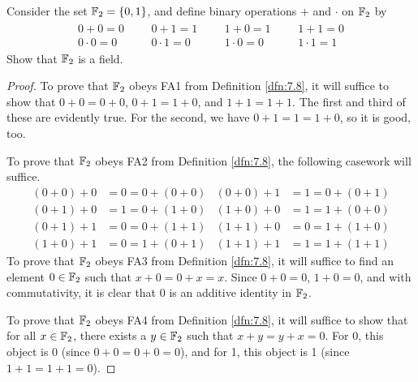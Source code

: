 \documentclass[../main.tex]{subfiles}
\begin{document}
\begin{exercise}\label{exr:7.9}
    Consider the set $\mathbb{F}_2=\{0,1\}$, and define binary operations $+$ and $\cdot$ on $\mathbb{F}_2$ by
    \begin{align*}
        \begin{split}
            0+0 = 0\\
            0\cdot 0 = 0
        \end{split}&&
        \begin{split}
            0+1 = 1\\
            0\cdot 1 = 0
        \end{split}&&
        \begin{split}
            1+0 = 1\\
            1\cdot 0 = 0
        \end{split}&&
        \begin{split}
            1+1 = 0\\
            1\cdot 1 = 1
        \end{split}
    \end{align*}
    Show that $\mathbb{F}_2$ is a field.
    \begin{proof}
        To prove that $\mathbb{F}_2$ obeys FA1 from Definition \ref{dfn:7.8}, it will suffice to show that $0+0=0+0$, $0+1=1+0$, and $1+1=1+1$. The first and third of these are evidently true. For the second, we have $0+1=1=1+0$, so it is good, too.\par
        To prove that $\mathbb{F}_2$ obeys FA2 from Definition \ref{dfn:7.8}, the following casework will suffice.
        \begin{align*}
            (0+0)+0 &= 0 = 0+(0+0)&
            (0+0)+1 &= 1 = 0+(0+1)\\
            (0+1)+0 &= 1 = 0+(1+0)&
            (1+0)+0 &= 1 = 1+(0+0)\\
            (0+1)+1 &= 0 = 0+(1+1)&
            (1+1)+0 &= 0 = 1+(1+0)\\
            (1+0)+1 &= 0 = 1+(0+1)&
            (1+1)+1 &= 1 = 1+(1+1)
        \end{align*}
        To prove that $\mathbb{F}_2$ obeys FA3 from Definition \ref{dfn:7.8}, it will suffice to find an element $0\in\mathbb{F}_2$ such that $x+0=0+x=x$. Since $0+0=0$, $1+0=0$, and with commutativity, it is clear that 0 is an additive identity in $\mathbb{F}_2$.\par
        To prove that $\mathbb{F}_2$ obeys FA4 from Definition \ref{dfn:7.8}, it will suffice to show that for all $x\in\mathbb{F}_2$, there exists a $y\in\mathbb{F}_2$ such that $x+y=y+x=0$. For 0, this object is 0 (since $0+0=0+0=0$), and for 1, this object is 1 (since $1+1=1+1=0$).\par

\end{proof}
\end{exercise}
\end{document}

